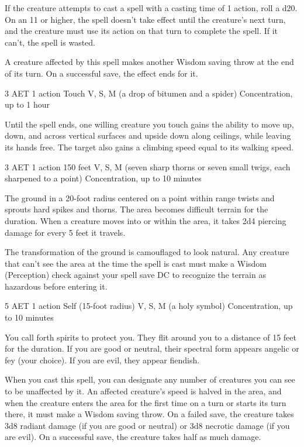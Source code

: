 If the creature attempts to cast a spell with a casting time of 1 action, roll a d20. On an 11 or higher, the spell doesn't take effect until the creature's next turn, and the creature must use its action on that turn to complete the spell. If it can't, the spell is wasted.

A creature affected by this spell makes another Wisdom saving throw at the end of its turn. On a successful save, the effect ends for it.

{3 AET}
{1 action}
{Touch}
{V, S, M (a drop of bitumen and a spider)}
{Concentration, up to 1 hour}

Until the spell ends, one willing creature you touch gains the ability to move up, down, and across vertical surfaces and upside down along ceilings, while leaving its hands free. The target also gains a climbing speed equal to its walking speed.

{3 AET}
{1 action}
{150 feet}
{V, S, M (seven sharp thorns or seven small twigs, each sharpened to a point)}
{Concentration, up to 10 minutes}

The ground in a 20-foot radius centered on a point within range twists and sprouts hard spikes and thorns. The area becomes difficult terrain for the duration. When a creature moves into or within the area, it takes 2d4 piercing damage for every 5 feet it travels.

The transformation of the ground is camouflaged to look natural. Any creature that can't see the area at the time the spell is cast must make a Wisdom (Perception) check against your spell save DC to recognize the terrain as hazardous before entering it.

{5 AET}
{1 action}
{Self (15-foot radius)}
{V, S, M (a holy symbol)}
{Concentration, up to 10 minutes}

You call forth spirits to protect you. They flit around you to a distance of 15 feet for the duration. If you are good or neutral, their spectral form appears angelic or fey (your choice). If you are evil, they appear fiendish.

When you cast this spell, you can designate any number of creatures you can see to be unaffected by it. An affected creature's speed is halved in the area, and when the creature enters the area for the first time on a turn or starts its turn there, it must make a Wisdom saving throw. On a failed save, the creature takes 3d8 radiant damage (if you are good or neutral) or 3d8 necrotic damage (if you are evil). On a successful save, the creature takes half as much damage.

